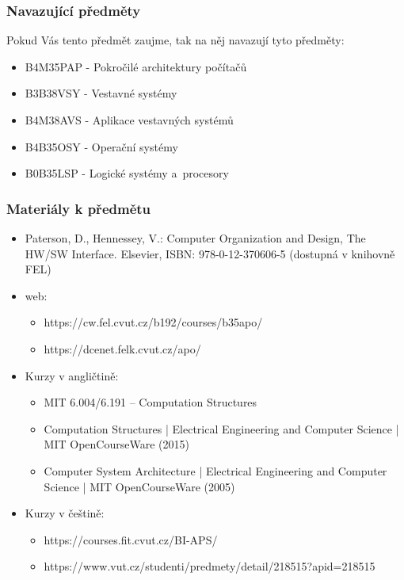 \documentclass{beamer}
\begin{document}
\begin{frame}
\frametitle{Navazující předměty}
Pokud Vás tento předmět zaujme, tak na něj navazují tyto předměty:
\begin{itemize}
\item B4M35PAP - Pokročilé architektury počítačů
\item B3B38VSY - Vestavné systémy
\item B4M38AVS - Aplikace vestavných systémů
\item B4B35OSY - Operační systémy
\item B0B35LSP - Logické systémy a procesory
\end{itemize}
\end{frame}


\begin{frame}
\frametitle{Materiály k předmětu}
\begin{itemize}
\item Paterson, D., Hennessey, V.: Computer Organization and Design, The HW/SW Interface. Elsevier, ISBN: 978-0-12-370606-5 (dostupná v knihovně FEL)
\item web:
\begin{itemize}
\item https://cw.fel.cvut.cz/b192/courses/b35apo/
\item https://dcenet.felk.cvut.cz/apo/
\end{itemize}
\item Kurzy v angličtině:
\begin{itemize}
\item MIT 6.004/6.191 – Computation Structures
\item Computation Structures | Electrical Engineering and Computer Science | MIT OpenCourseWare (2015)
\item Computer System Architecture | Electrical Engineering and Computer Science | MIT OpenCourseWare (2005)
\end{itemize}
\item Kurzy v češtině:
\begin{itemize}
\item https://courses.fit.cvut.cz/BI-APS/
\item https://www.vut.cz/studenti/predmety/detail/218515?apid=218515
\end{itemize}

\end{itemize}
\end{frame}
\end{document}
